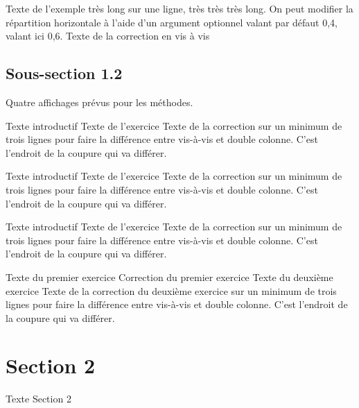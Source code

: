 \documentclass[nocrop]{sesamanuel}
\begin{document}
\begin{exemple}[0.6]
  Texte de l’exemple très long sur une ligne, très très très long.
  On peut modifier la répartition horizontale  à l'aide d'un argument optionnel valant par défaut 0,4, valant ici 0,6.
  \correction
  Texte de la correction en vis à vis
\end{exemple}

\subsection{Sous-section 1.2}
Quatre affichages prévus pour les méthodes.

\begin{methode}
  Texte introductif
  \exercice
  Texte de l’exercice
  \correction
  Texte de la correction sur un minimum de trois lignes pour faire la
  différence entre vis-à-vis et double colonne. C’est l’endroit de la
  coupure qui va différer.
\end{methode}

\begin{methode*1}
  Texte introductif
  \exercice
  Texte de l’exercice
  \correction
  Texte de la correction sur un minimum de trois lignes pour faire la
  différence entre vis-à-vis et double colonne. C’est l’endroit de la
  coupure qui va différer.
\end{methode*1}

\begin{methode*2}
  Texte introductif
  \exercice
  Texte de l’exercice
  \correction
  Texte de la correction sur un minimum de trois lignes pour faire la
  différence entre vis-à-vis et double colonne. C’est l’endroit de la
  coupure qui va différer.
\end{methode*2}

\begin{methode*2*2}
  \exercice
  \label{methode-exemple}
  Texte du premier exercice
  \correction
  Correction du premier exercice
  \exercice
  Texte du deuxième exercice
  \correction
  Texte de la correction du deuxième exercice sur un minimum de trois
  lignes pour faire la différence entre vis-à-vis et double
  colonne. C’est l’endroit de la coupure qui va différer.
\end{methode*2*2}

\section{Section 2}
Texte Section 2
\end{document}
